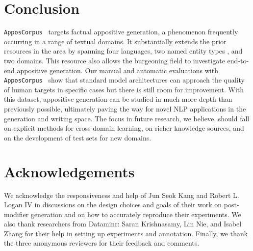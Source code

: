 \documentclass[11pt]{article}
\newcommand{\yktodo}[1]{\todo[color=green!20]{#1}}
\newcommand{\jttodo}[1]{\todo[color=blue!20]{#1}}
\newcommand{\corpus}{\texttt{ApposCorpus}}
\begin{document}
\section{Conclusion}
\label{sec:conclusion}
\corpus~ targets factual appositive generation, a phenomenon frequently occurring in a range of textual domains.  It substantially extends the prior resources in the area by spanning four languages, two named entity types 
, and two domains.  This resource also allows the burgeoning field to investigate end-to-end appositive generation.  
Our manual and automatic evaluations with \corpus~ show that standard model architectures can approach the quality of human targets in specific cases but there is still room for improvement.
With this dataset, appositive generation can be studied in much more depth than previously possible, ultimately paving the way for novel NLP applications in the generation and writing space. The focus in future research, we believe, should fall on explicit methods for cross-domain learning, on richer knowledge sources, and on the development of test sets for new domains. 

\section{Acknowledgements}
We acknowledge the responsiveness and help of Jun Seok Kang and Robert L. Logan IV in discussions on the design choices and goals of their work on post-modifier generation and on how to accurately reproduce their experiments.  We also thank researchers from Dataminr: Saran Krishnasamy, Lin Nie, and Isabel Zhang for their help in setting up experiments and annotation.  Finally, we thank the three anonymous reviewers for their feedback and comments.


\end{document}
